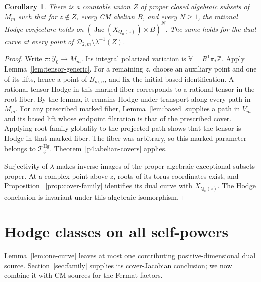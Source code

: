 \documentclass[11pt]{article}
\newcommand{\Z}{\mathbb Z}
\newcommand{\Jac}{\operatorname{Jac}}
\newcommand{\D}{\mathcal D}
\newcommand{\V}{\mathbb V}
\newcommand{\cY}{\mathcal Y}
\theoremstyle{plain}
\newtheorem{corollary}[theorem]{Corollary}
\theoremstyle{definition}
\theoremstyle{remark}
\numberwithin{equation}{section}
\begin{document}
\begin{corollary}\label{cor:good-curves}
There is a countable union \(Z\) of proper closed algebraic subsets
of \(M_m\) such that
for \(z\notin Z\), every CM abelian \(B\), and every \(N\geq1\),
the rational Hodge conjecture holds on
\((\Jac(X_{Q_0(z)})\times B)^N\).  The same holds for the dual
curve at every point of \(\D_{2,m}\setminus\lambda^{-1}(Z)\).
\end{corollary}
\begin{proof}
Write \(\pi:\cY_0\to M_m\).  Its integral polarized variation is
\(\V=R^1\pi_*\Z\).  Apply Lemma~\ref{lem:tensor-generic}.
For a remaining \(z\), choose an auxiliary point and one of its
lifts, hence a point of \(B_{m,n}\), and fix the initial based
identification.  A rational tensor Hodge in this marked fiber
corresponds to a rational tensor in the root fiber.  By the
lemma, it remains Hodge under transport along every path in
\(M_m\).  For any prescribed marked fiber,
Lemma~\ref{lem:based} supplies a path in \(V_m\) and its based
lift whose endpoint filtration is that of the prescribed cover.
Applying root-family globality to the projected path shows that
the tensor is Hodge in that marked fiber.  The fiber was arbitrary,
so this marked parameter belongs to $\mathcal T_\phi^{\mathrm{Hg}}$.
Theorem~\ref{p4:abelian-covers} applies.

Surjectivity of \(\lambda\) makes inverse images of the proper
algebraic exceptional subsets proper.  At a complex point above
\(z\), roots of its torus coordinates exist, and Proposition~
\ref{prop:cover-family} identifies its dual curve with
\(X_{Q_0(z)}\).  The Hodge conclusion is invariant under this
algebraic isomorphism.
\end{proof}

\section{Hodge classes on all self-powers}\label{sec:assembly}
Lemma~\ref{lem:one-curve} leaves at most one contributing
positive-dimensional dual source.  Section~\ref{sec:family}
supplies its cover-Jacobian conclusion; we now combine it with
CM sources for the Fermat factors.
\end{document}

